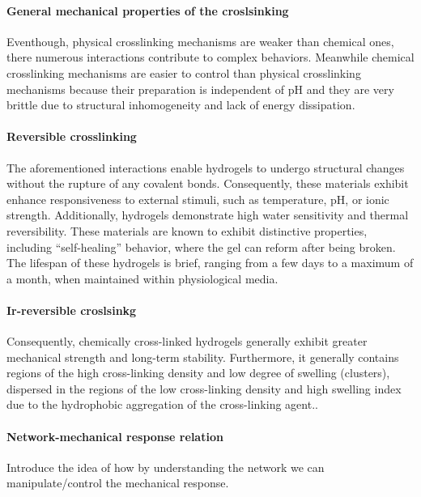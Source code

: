 \paragraph{General mechanical properties of the croslsinking}
Eventhough, physical crosslinking mechanisms are weaker than chemical ones, there numerous interactions contribute to complex behaviors.
Meanwhile chemical crosslinking mechanisms are easier to control than physical crosslinking mechanisms because their preparation is independent of pH\citep{bustamantetorresHydrogelsClassificationAccording2021} and they are very brittle due to structural inhomogeneity and lack of energy dissipation\citep{xuRoleChemicalPhysical2018}.


\paragraph{Reversible crosslinking}
The aforementioned interactions enable hydrogels to undergo structural changes without the rupture of any covalent bonds. 
Consequently, these materials exhibit enhance responsiveness to external stimuli, such as temperature, pH, or ionic strength. 
Additionally, hydrogels demonstrate high water sensitivity and thermal reversibility\citep{bustamantetorresHydrogelsClassificationAccording2021,priyaComprehensiveReviewHydrogel2024}.
These materials are known to exhibit distinctive properties, including ``self-healing'' behavior, where the gel can reform after being broken.
The lifespan of these hydrogels is brief, ranging from a few days to a maximum of a month, when maintained within physiological media.


\paragraph{Ir-reversible croslsinkg}
Consequently, chemically cross-linked hydrogels generally exhibit greater mechanical strength and long-term stability.  
Furthermore, it generally contains regions of the high cross-linking density and low degree of swelling (clusters), dispersed in the regions of the low cross-linking density and high swelling index due to the hydrophobic aggregation of the cross-linking agent\citep{bustamantetorresHydrogelsClassificationAccording2021}..


\paragraph{Network-mechanical response relation} Introduce the idea of how by understanding the network we can manipulate/control the mechanical response.

